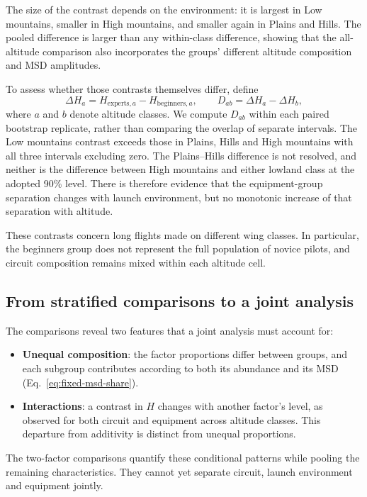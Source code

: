 The size of the contrast depends on the environment: it is largest in Low mountains, smaller in
High mountains, and smaller again in Plains and Hills. The pooled difference is
larger than any within-class difference, showing that the all-altitude comparison
also incorporates the groups' different altitude composition and MSD amplitudes.

\begin{table}[htbp]
 \centering\small
 
 \caption{Experts-minus-beginners contrasts in the effective exponent, first
 pooling all altitudes and then within each class. The same bootstrap draws
 provide every contrast.}
 \label{tab:conditional-equipment}
\end{table}

To assess whether those contrasts themselves differ, define
\begin{equation}
 \Delta H_a=H_{\mathrm{experts},a}-H_{\mathrm{beginners},a},
 \qquad D_{ab}=\Delta H_a-\Delta H_b,
 \label{eq:conditional-interaction}
\end{equation}
where $a$ and $b$ denote altitude classes. We compute $D_{ab}$ within each paired
bootstrap replicate, rather than comparing the overlap of separate intervals.
The Low mountains contrast exceeds those in Plains, Hills and High mountains
with all three intervals excluding zero. The Plains--Hills difference is not
resolved, and neither is the difference between High mountains and either
lowland class at the adopted 90\% level. There is therefore evidence that the
equipment-group separation changes with launch environment, but no monotonic
increase of that separation with altitude.

These contrasts concern long flights made on different wing classes. In
particular, the beginners group does not represent the full population of
novice pilots, and circuit composition remains mixed within each altitude cell.
\FloatBarrier

\subsection{From stratified comparisons to a joint analysis}
\label{sec:conditional-synthesis}

The comparisons reveal two features that a joint analysis must account for:
\begin{itemize}
 \item \textbf{Unequal composition}: the factor proportions differ between
 groups, and each subgroup contributes according to both its abundance and
 its MSD (Eq.~\eqref{eq:fixed-msd-share}).
 \item \textbf{Interactions}: a contrast in $H$ changes with another
 factor's level, as observed for both circuit and equipment across altitude
 classes. This departure from additivity is distinct from unequal proportions.
\end{itemize}
The two-factor comparisons quantify these conditional patterns while pooling
the remaining characteristics. They cannot yet separate circuit, launch
environment and equipment jointly.

